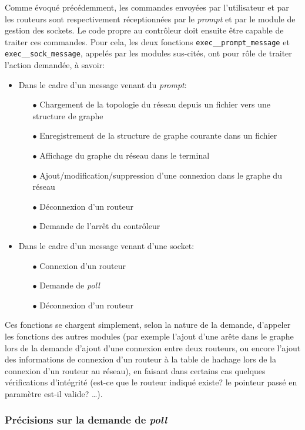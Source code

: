 \documentclass[a4paper,11pt]{article}
\begin{document}
Comme évoqué précédemment, les commandes envoyées par l'utilisateur et par les routeurs sont respectivement réceptionnées par le \textit{prompt} et par le module de gestion des sockets. Le code propre au contrôleur doit ensuite être capable de traiter ces commandes. Pour cela, les deux fonctions \texttt{exec\_\_prompt\_message} et \texttt{exec\_\_sock\_message}, appelés par les modules sus-cités, ont pour rôle de traiter l'action demandée, à savoir:
\begin{itemize}
 \item Dans le cadre d'un message venant du \textit{prompt}:
 \begin{itemize}
  \item[$\bullet$] Chargement de la topologie du réseau depuis un fichier vers une structure de graphe
  \item[$\bullet$] Enregistrement de la structure de graphe courante dans un fichier
  \item[$\bullet$] Affichage du graphe du réseau dans le terminal
  \item[$\bullet$] Ajout/modification/suppression d'une connexion dans le graphe du réseau
  \item[$\bullet$] Déconnexion d'un routeur
  \item[$\bullet$] Demande de l'arrêt du contrôleur
 \end{itemize}
 \item Dans le cadre d'un message venant d'une socket:
 \begin{itemize}
  \item[$\bullet$] Connexion d'un routeur
  \item[$\bullet$] Demande de \textit{poll}
  \item[$\bullet$] Déconnexion d'un routeur
 \end{itemize}
\end{itemize}
Ces fonctions se chargent simplement, selon la nature de la demande, d'appeler les fonctions des autres modules (par exemple l'ajout d'une arête dans le graphe lors de la demande d'ajout d'une connexion entre deux routeurs, ou encore l'ajout des informations de connexion d'un routeur à la table de hachage lors de la connexion d'un routeur au réseau), en faisant dans certains cas quelques vérifications d'intégrité (est-ce que le routeur indiqué existe? le pointeur passé en paramètre est-il valide? \dots).

\subsubsection*{Précisions sur la demande de \textit{poll}}
\end{document}
